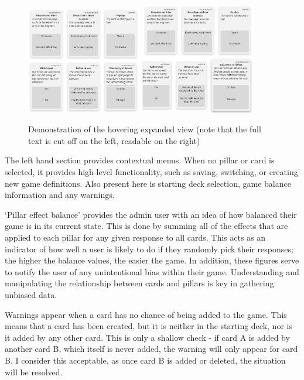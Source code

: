\begin{figure}[!h]
	\centering
	\includegraphics[width=0.45\textwidth]{./images/design/cards_not_expanded.png}
	\includegraphics[width=0.45\textwidth]{./images/design/cards_expanded.png}
	\caption{Demonstration of the hovering expanded view (note that the full text is cut off on the left, readable on the right)}
	\label{fig:expand}
\end{figure}

The left hand section provides contextual menus. When no pillar or card is selected, it provides high-level functionality, such as saving, switching, or creating new game definitions. Also present here is starting deck selection, game balance information and any warnings.

`Pillar effect balance' provides the admin user with an idea of how balanced their game is in its current state. This is done by summing all of the effects that are applied to each pillar for any given response to all cards. This acts as an indicator of how well a user is likely to do if they randomly pick their responses; the higher the balance values, the easier the game. In addition, these figures serve to notify the user of any unintentional bias within their game. Understanding and manipulating the relationship between cards and pillars is key in gathering unbiased data.

Warnings appear when a card has no chance of being added to the game. This means that a card has been created, but it is neither in the starting deck, nor is it added by any other card. This is only a shallow check - if card A is added by another card B, which itself is never added, the warning will only appear for card B. I consider this acceptable, as once card B is added or deleted, the situation will be resolved.

